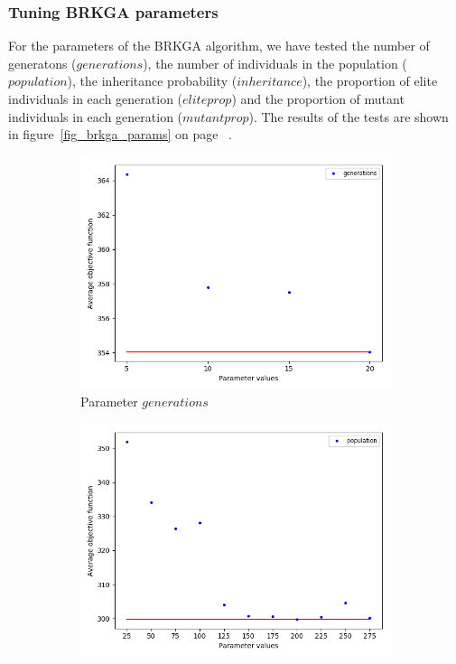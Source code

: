 \pagebreak

\subsubsection{Tuning BRKGA parameters}

For the parameters of the BRKGA algorithm, we have tested the number of generatons ($generations$), the number of individuals in the population ($population$), the inheritance probability ($inheritance$), the proportion of elite individuals in each generation ($eliteprop$) and the proportion of mutant individuals in each generation ($mutantprop$). The results of the tests are shown in figure~\ref{fig_brkga_params} on page~\pageref{fig_brkga_params} .\\

\begin{figure}[H]
\begin{subfigure}[b]{.49\linewidth}
\centering
\includegraphics[width=0.8\linewidth]{./img/best-generation.png}
\caption{ Parameter $generations$}\label{fig2a}
\end{subfigure}\hfill
\begin{subfigure}[b]{.49\linewidth}
\centering
\includegraphics[width=0.8\linewidth]{./img/best-population.png}

\end{subfigure}
\end{figure}
